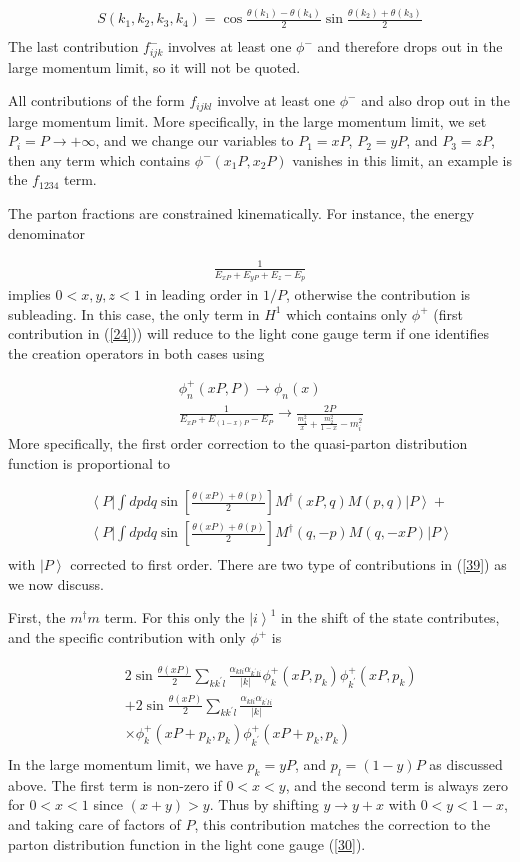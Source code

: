 \documentclass[showpacs,twocolumn,aps,preprintnumbers,letterpaper]{revtex4}
\newcommand{\be}{\begin{equation}}
\newcommand{\ee}{\end{equation}}
\def\be{\begin{eqnarray}}
\def\ee{\end{eqnarray}}
\begin{document}
\be
\label{37}
S(k_1,k_2,k_3,k_4)=\cos \frac{\theta(k_1)-\theta(k_4)}{2}\sin \frac{\theta(k_2)+\theta(k_3)}{2} \nonumber\\
\ee
The last contribution $f_{ijk}^-$  involves at least one $\phi^-$ and therefore drops out in the 
large momentum limit, so it will not be quoted. 


All  contributions of the form $f_{ijkl}$ 
involve at least one $\phi^{-}$ and also drop out in the large momentum limit. 
More specifically, in the large momentum limit, we set $P_i=P\rightarrow +\infty$, and we change our variables to $P_1=xP$, $P_2=yP$, and  $P_3=zP$, then any term which contains $\phi^{-}(x_1P,x_2P)$ vanishes in this limit,  an example is  the $f_{1234}$ term.  


The parton fractions are constrained kinematically. For instance, the energy denominator 


\be
\frac{1}{E_{xP}+E_{yP}+E_{z}-E_p}\nonumber
\ee
implies  $0<x,y,z<1$ in leading order in $1/P$, otherwise the contribution  is subleading. 
In this case, the only term in $H^{1}$ which contains only $\phi^{+}$ (first contribution in (\ref{24}))
will reduce to the light cone gauge term if one identifies
the creation operators in both cases using



\be
\label{38}
&&\phi^{+}_n(xP,P)\rightarrow \phi_n(x)\nonumber\\
&&\frac{1}{E_{xP}+E_{(1-x)P}-E_P}\rightarrow \frac{2P}{\frac{m_1^2}{x}+\frac{m_2^2}{1-x}-m_i^2}
\ee
More specifically, the first order correction to the quasi-parton distribution function is proportional to

\be
\label{39}
&&\left<P\right|\int dp dq \sin \left[\frac{\theta(xP)+\theta(p)}{2}\right]M^{\dagger}(xP,q)M(p,q)\left|P\right>+\nonumber\\ 
&&\left<P\right|\int dp dq \sin \left[\frac{\theta(xP)+\theta(p)}{2}\right]M^{\dagger}(q,-p)M(q,-xP)\left|P\right>\nonumber\\
\ee
with $\left|P\right>$ corrected to first order.  There are two type of contributions in (\ref{39})
as we now discuss.


First, the $m^{\dagger}m$ term. For this only the $\left|i\right>^{1}$ in the shift of the state 
contributes, and the specific contribution  with only $\phi^{+}$ is

\be
\label{40}
&&2\sin \frac{\theta(xP)}{2}\sum_{kk^{\prime}l}\frac{\alpha_{kli}\alpha_{k^{\prime }li}}{|k|} \phi^{+}_k(xP,p_k)\phi^{+}_{k^{\prime}}(xP,p_k)\nonumber \\ 
&&+2\sin \frac{\theta(xP)}{2}\sum_{kk^{\prime}l}\frac{\alpha_{kli}\alpha_{k^{\prime }li}}{|k|} \nonumber\\
&&\times \phi^{+}_k(xP+p_k,p_k)\phi^{+}_{k^{\prime}}(xP+p_k,p_k)\nonumber \\
\ee
In the large momentum limit, we have $p_k=yP$,  and $p_l=(1-y)P$ as discussed above.
The first term is non-zero if $0<x<y$, and the second term is always zero for $0<x<1$ since  $(x+y)>y$. 
Thus by shifting $y\rightarrow y+x$ with $0<y<1-x$, and taking care of factors of $P$,  this contribution matches
the correction to the parton distribution function in the light cone gauge (\ref{30}).
\end{document}
